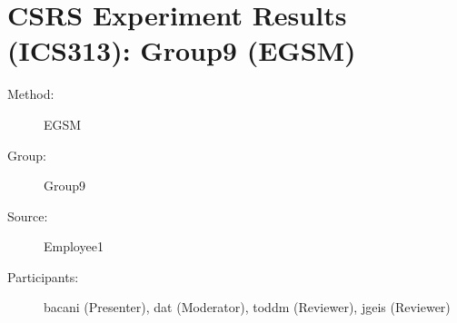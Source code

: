 
%          
\chapter {CSRS Experiment Results (ICS313): Group9 (EGSM)}
\small
	  

\begin{description}
\item [Method:] EGSM
\item [Group:] Group9
\item [Source:] Employee1
\item [Participants:] bacani (Presenter), dat (Moderator), toddm (Reviewer), jgeis (Reviewer)
\end{description}
